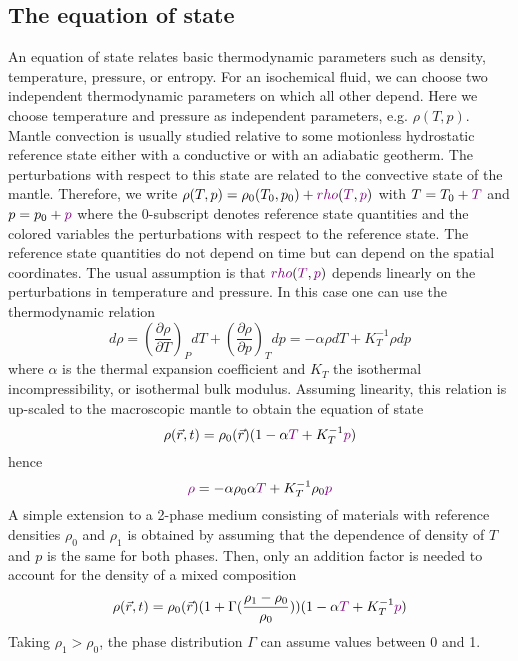 \subsection{The equation of state}

An equation of state relates basic thermodynamic parameters such as density,
temperature, pressure, or entropy. For an isochemical fluid, we can choose two
independent thermodynamic parameters on which all other depend. Here we choose
temperature and pressure as independent parameters, e.g. $\rho(T,p)$. 
Mantle convection is
usually studied relative to some motionless hydrostatic reference state either with a
conductive or with an adiabatic geotherm. The perturbations with respect to this state are
related to the convective state of the mantle. 
Therefore, we write $\rho(T,p) = \rho_0(T_0,p_0) 
+ {\color{violet}rho}({\color{violet}T},{\color{violet} p} )$
with 
$T = T_0 + {\color{violet}T}$ and 
$p = p_0 + {\color{violet}p}$ 
where the 0-subscript denotes reference
state quantities and the {\color{violet}colored} variables 
the perturbations with respect to the reference state. The
reference state quantities do not depend on time but can depend on the spatial
coordinates. The usual assumption is that ${\color{violet}rho}({\color{violet}T},{\color{violet} p})$ 
depends linearly on the perturbations in temperature and pressure. 
In this case one can use the thermodynamic relation
\[
d\rho = 
\left( \frac{\partial \rho}{\partial T} \right)_P dT + 
\left( \frac{\partial \rho}{\partial p} \right)_T dp 
= -\alpha \rho dT + K_T^{-1} \rho dp
\]
where $\alpha$ is the thermal expansion coefficient and 
$K_T$ the isothermal incompressibility, or isothermal bulk
modulus. Assuming linearity, this relation is up-scaled to the macroscopic mantle to
obtain the equation of state
\begin{equation}
\rho(\vec{r},t) = \rho_0(\vec{r}) (1-\alpha {\color{violet}T} + K_T^{-1} {\color{violet}p} )
\label{eq:md68}
\end{equation}
hence
\[
{\color{violet} \rho} = -\alpha \rho_0 \alpha {\color{violet}T} +  K_T^{-1} \rho_0 {\color{violet}p} 
\]
A simple extension to a 2-phase medium consisting of materials with reference
densities $\rho_0$ and $\rho_1$ is obtained by assuming that the dependence of density of $T$ and $p$ 
is the same for both phases. Then, only an addition factor is needed to account for the
density of a mixed composition
\begin{equation}
\rho(\vec{r},t) = \rho_0(\vec{r})(1+\Gamma(\frac{\rho_1-\rho_0}{\rho_0})) 
(1-\alpha {\color{violet}T} + K_T^{-1} {\color{violet}p} )
\label{eq:md69}
\end{equation}
Taking $\rho_1>\rho_0$, the phase distribution $\Gamma$ can assume values between 0 and 1.

